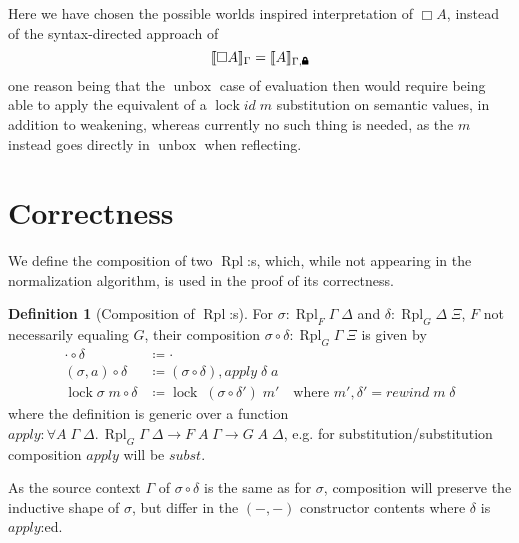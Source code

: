 \documentclass{article}
\theoremstyle{definition}\newtheorem{definition}{Definition}
\newcommand{\lock}{\text{\tikz[baseline]{
      \fill[rounded corners=.1ex] (-.75ex,0) rectangle (.75ex,1ex);
      \draw[line width=.3ex] (-.4ex,.5ex) -- ++(0,.75ex) arc (180:0:.4ex) -- ++(0,-.75ex);
}}}
\DeclareMathOperator\unbox{unbox}
\begin{document}
Here we have chosen the possible worlds inspired interpretation of $\Box A$,
instead of the syntax-directed approach of
$$ \llbracket \Box A \rrbracket_\Gamma = \llbracket A \rrbracket_{\Gamma, \lock}$$
one reason being that the $\unbox$ case of evaluation then would require
being able to apply the equivalent of a $\operatorname{lock} \textit{id} \; m$ substitution
on semantic values, in addition to weakening,
whereas currently no such thing is needed,
as the $m$ instead goes directly in $\unbox$ when reflecting.

\section{Correctness}

We define the composition of two $\operatorname{Rpl}$:s, which,
while not appearing in the normalization algorithm,
is used in the proof of its correctness.
\begin{definition}[Composition of $\operatorname{Rpl}$:s]\label{def:composition}
  For $\sigma : \operatorname{Rpl}_F \Gamma \; \Delta$
  and $\delta : \operatorname{Rpl}_G \Delta \; \Xi$,
  $F$ not necessarily equaling $G$,
  their composition $\sigma \circ \delta : \operatorname{Rpl}_G \Gamma \; \Xi$
  is given by
  \begin{align*}
    \cdot \circ \delta &\coloneqq \cdot \\
    (\sigma , a) \circ \delta &\coloneqq (\sigma \circ \delta) , \textit{apply} \; \delta \; a \\
    \operatorname{lock} \sigma \; m \circ \delta &\coloneqq \operatorname{lock} \; (\sigma \circ \delta') \; m'
    \quad \text{where } m' , \delta' = \textit{rewind} \; m \; \delta
  \end{align*}
  where the definition is generic over a function
  $\textit{apply} : \forall A \; \Gamma \; \Delta.\, \operatorname{Rpl}_G \Gamma \; \Delta \to F \; A \; \Gamma \to G \; A \; \Delta$,
  e.g. for substitution/substitution composition
  $\textit{apply}$ will be $\textit{subst}$.
\end{definition}
As the source context $\Gamma$ of $\sigma \circ \delta$ is the same as for $\sigma$,
composition will preserve the inductive shape of $\sigma$,
but differ in the $(-,-)$ constructor contents
where $\delta$ is $\textit{apply}$:ed.
\end{document}
